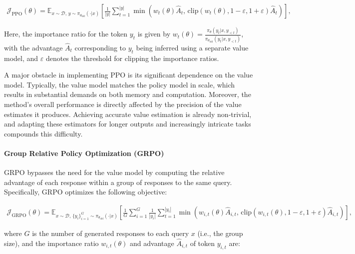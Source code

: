 \begin{align}
\mathcal{J}_\text{PPO}(\theta) = \mathbb{E}_{ x \sim \mathcal{D},\, y \sim \pi_{\theta_\text{old}}( \cdot | x) }
\left[ \frac{1}{|y|} \sum_{t=1}^{|y|} 
\min \left( w_{t}(\theta) \widehat{A}_{t},  \, \mathrm{clip} \left( w_{t}(\theta), 1 - {\varepsilon}, 1 + {\varepsilon}\right) \widehat{A}_{t} \right)
\right],
\end{align}

Here, the importance ratio for the token $y_t$ is given by $
w_{t}(\theta) = \frac{ \pi_{\theta} (y_{t} | x, y_{<t}) }{ \pi_{\theta_\text{old}} (y_{t} | x,y_{<t})} $, with the advantage $\widehat{A}_{t}$ corresponding to $y_t$ being inferred using a separate value model, and $\varepsilon$ denotes the threshold for clipping the importance ratios.

A major obstacle in implementing PPO is its significant dependence on the value model. Typically, the value model matches the policy model in scale, which results in substantial demands on both memory and computation. Moreover, the method’s overall performance is directly affected by the precision of the value estimates it produces. Achieving accurate value estimation is already non-trivial, and adapting these estimators for longer outputs and increasingly intricate tasks compounds this difficulty.

\paragraph{Group Relative Policy Optimization (GRPO)} GRPO \citep{grpo} bypasses the need for the value model by computing the relative advantage of each response within a group of responses to the same query. Specifically, GRPO optimizes the following objective:

\begin{align}
\label{equ:grpo}
\mathcal{J}_\text{GRPO}(\theta) = \mathbb{E}_{ x \sim \mathcal{D},\, \{y_i\}_{i=1}^G \sim \pi_{\theta_\text{old}}( \cdot | x) }
\left[ \frac{1}{G} \sum_{i=1}^{G} \frac{1}{|y_i|} \sum_{t=1}^{|y_i|} 
\min \left( w_{i,t}(\theta) \widehat{A}_{i,t},  \, \mathrm{clip} \left( w_{i,t}(\theta), 1 - {\varepsilon}, 1 + {\varepsilon}\right) \widehat{A}_{i,t} \right)
\right],
\end{align}

where $G$ is the number of generated responses to each query $x$ (i.e., the group size), and the importance ratio $w_{i,t}(\theta)$ and advantage $\widehat{A}_{i,t}$ of token $y_{i,t}$ are:

